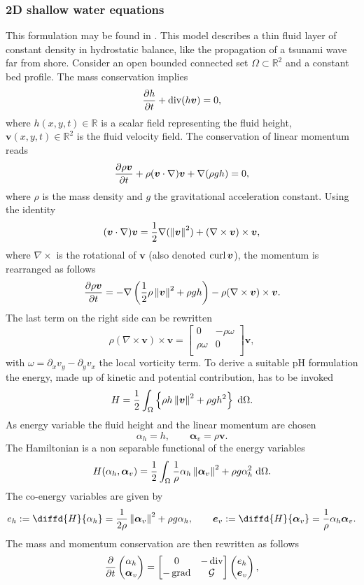 \subsubsection{2D shallow water equations}
This formulation may be found in \cite[Section 6.2.]{cardoso2016}. This model describes a thin fluid layer of constant density in hydrostatic balance, like the propagation of a tsunami wave far from shore. Consider an open bounded connected set $\Omega \subset \mathbb{R}^2$ and a constant bed profile. The mass conservation implies
\[
\diffp{h}{t} + \div(h\bm{v}) = 0,
\]
where $h(x,y,t) \in \mathbb{R}$ is a scalar field representing the fluid height, $\bm{v}(x,y,t) \in \mathbb{R}^2$ is the fluid velocity field. The conservation of linear momentum reads
\[
\diffp{\rho\bm{v}}{t} + \rho (\bm{v} \cdot \nabla) \bm{v} + \nabla(\rho g h) = 0,
\]
where $\rho$ is the mass density and $g$ the gravitational acceleration constant. Using the identity
\[
(\bm{v} \cdot \nabla) \bm{v} = \frac{1}{2} \nabla(\left\|\bm{v}\right\|^2)  + (\nabla \times \bm{v}) \times \bm{v}, 
\]
where $\nabla \times$ is the rotational of $\bm{v}$ (also denoted $\operatorname*{curl} \bm{v}$), the momentum is rearranged as follows
\[
\diffp{\rho \bm{v}}{t} = -\nabla\left(\frac{1}{2}\rho \norm{\bm{v}}^2 + \rho g h\right) - \rho (\nabla \times \bm{v}) \times \bm{v}.
\]
The last term on the right side can be rewritten
\[
\rho (\nabla \times \bm{v}) \times \bm{v} =   
\begin{bmatrix}
0 & -\rho\omega \\
\rho\omega & 0 \\
\end{bmatrix}
\bm{v},
\]
with $\omega = \partial_x v_y - \partial_y v_x$ the local vorticity term. To derive a suitable pH formulation the energy, made up of kinetic and potential contribution, has to be invoked
\[
H = \frac{1}{2} \int_\Omega \left\{\rho h \norm{\bm{v}}^2 + \rho g h^2 \right\}  \d\Omega.
\]
As energy variable the fluid height and the linear momentum are chosen
\[
\alpha_h = h, \qquad \bm{\alpha}_v = \rho \bm{v}.
\]
The Hamiltonian is a non separable functional of the energy variables
\[
H(\alpha_h, \bm{\alpha}_v) = \frac{1}{2} \int_\Omega \frac{1}{\rho} \alpha_h \norm{\bm{\alpha}_v}^2 + \rho g \alpha_h^2 \d\Omega.
\]
The co-energy variables are given by
\[
e_h := \diffd{H}{\alpha_h} = \frac{1}{2 \rho} \norm{\bm{\alpha}_v}^2 + \rho g \alpha_h, \qquad \bm{e}_v := \diffd{H}{\bm{\alpha}_v} = \frac{1}{\rho} \alpha_h \bm{\alpha}_v.
\]
The mass and momentum conservation are then rewritten as follows
\[
\diffp{}{t}
\begin{pmatrix}
\alpha_h \\
\bm{\alpha}_v \\
\end{pmatrix} = 
\begin{bmatrix}
0 & -\div \\
-\grad & \mathcal{G}
\end{bmatrix}
\begin{pmatrix}
e_h \\
\bm{e}_v \\
\end{pmatrix},
\]
